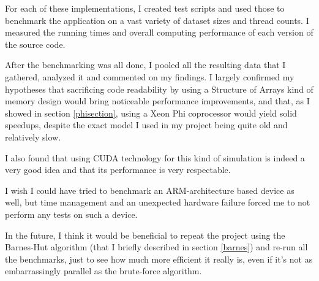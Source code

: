 \documentclass[journal]{IEEEtran}
\begin{document}
		For each of these implementations, I created test scripts and used those to benchmark the application on a vast variety of dataset sizes and thread counts. I measured the running times and overall computing performance of each version of the source code.
		
		After the benchmarking was all done, I pooled all the resulting data that I gathered, analyzed it and commented on my findings. I largely confirmed my hypotheses that sacrificing code readability by using a Structure of Arrays kind of memory design would bring noticeable performance improvements, and that, as I showed in section \ref{phisection}, using a Xeon Phi coprocessor would yield solid speedups, despite the exact model I used in my project being quite old and relatively slow.
		
		I also found that using CUDA technology for this kind of simulation is indeed a very good idea and that its performance is very respectable.
		
		I wish I could have tried to benchmark an ARM-architecture based device as well, but time management and an unexpected hardware failure forced me to not perform any tests on such a device.
		
		In the future, I think it would be beneficial to repeat the project using the Barnes-Hut algorithm (that I briefly described in section \ref{barnes}) and re-run all the benchmarks, just to see how much more efficient it really is, even if it's not as embarrassingly parallel as the brute-force algorithm.
		
	
	
	
\end{document}
